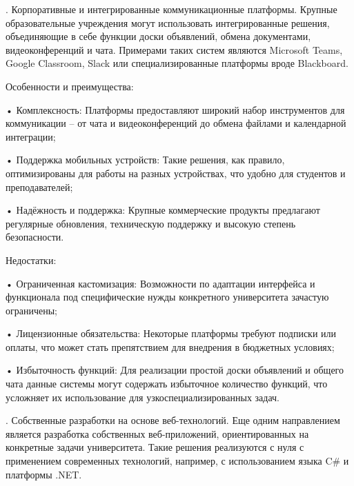 {	\par {}. Корпоративные и интегрированные коммуникационные платформы. Крупные образовательные учреждения могут использовать интегрированные решения, объединяющие в себе функции доски объявлений, обмена документами, видеоконференций и чата. Примерами таких систем являются Microsoft Teams, Google Classroom, Slack или специализированные платформы вроде Blackboard.
	
	\par \redline Особенности и преимущества:
	
	\par \redline • Комплексность: Платформы предоставляют широкий набор инструментов для коммуникации – от чата и видеоконференций до обмена файлами и календарной интеграции;
	
	\par \redline • Поддержка мобильных устройств: Такие решения, как правило, оптимизированы для работы на разных устройствах, что удобно для студентов и преподавателей;
	
	\par \redline • Надёжность и поддержка: Крупные коммерческие продукты предлагают регулярные обновления, техническую поддержку и высокую степень безопасности.
	
	\par \redline Недостатки:
	
	\par \redline • Ограниченная кастомизация: Возможности по адаптации интерфейса и функционала под специфические нужды конкретного университета зачастую ограничены;
	
	\par \redline • Лицензионные обязательства: Некоторые платформы требуют подписки или оплаты, что может стать препятствием для внедрения в бюджетных условиях;
	
	\par \redline • Избыточность функций: Для реализации простой доски объявлений и общего чата данные системы могут содержать избыточное количество функций, что усложняет их использование для узкоспециализированных задач. 
	
	\par {}. Собственные разработки на основе веб-технологий. Еще одним направлением является разработка собственных веб-приложений, ориентированных на конкретные задачи университета. Такие решения реализуются с нуля с применением современных технологий, например, с использованием языка C\# и платформы .NET.
	
}
